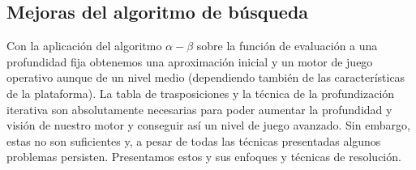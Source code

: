 \documentclass[letterpaper,12pt]{article}
\begin{document}
\subsection{Mejoras del algoritmo de búsqueda}

Con la aplicación del algoritmo $\alpha-\beta$ sobre la función de evaluación a una 
profundidad fija obtenemos una aproximación inicial y un motor de juego operativo aunque
de un nivel medio (dependiendo también de las características de la plataforma). La tabla
de trasposiciones y la técnica de la profundización iterativa son absolutamente necesarias
para poder aumentar la profundidad y visión de nuestro motor y conseguir así un nivel de
juego avanzado. Sin embargo, estas no son suficientes y, a pesar de todas las técnicas
presentadas algunos problemas persisten. Presentamos estos y sus enfoques y técnicas de 
resolución.
\end{document}
